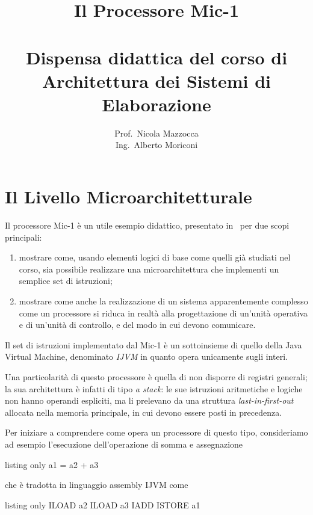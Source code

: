 \documentclass[a4paper,12pt]{scrreprt}
\title{Il Processore Mic-1 \\
  \ \\
  \large Dispensa didattica del corso di\\
  Architettura dei Sistemi di Elaborazione}
\author{Prof.\ Nicola Mazzocca \\
  Ing.\ Alberto Moriconi}
\date{}
\begin{document}
\maketitle

\chapter{Il Livello Microarchitetturale}

Il processore Mic-1 è un utile esempio didattico, presentato in~\cite{tanenbaum}
per due scopi principali:
\begin{enumerate}
  \item mostrare come, usando elementi logici di base come quelli già studiati
  nel corso, sia possibile realizzare una microarchitettura che implementi un
  semplice set di istruzioni;
  \item mostrare come anche la realizzazione di un sistema apparentemente
  complesso come un processore si riduca in realtà alla progettazione di
  un'unità operativa e di un'unità di controllo, e del modo in cui devono
  comunicare.
\end{enumerate}

Il set di istruzioni implementato dal Mic-1 è un sottoinsieme di quello della
Java Virtual Machine, denominato \textit{IJVM} in quanto opera unicamente sugli
interi.

Una particolarità di questo processore è quella di non disporre di registri
generali; la sua architettura è infatti di tipo \textit{a stack}: le sue
istruzioni aritmetiche e logiche non hanno operandi espliciti, ma li prelevano
da una struttura \textit{last-in-first-out} allocata nella memoria principale,
in cui devono essere posti in precedenza.

\medskip

Per iniziare a comprendere come opera un processore di questo tipo, consideriamo
ad esempio l'esecuzione dell'operazione di somma e assegnazione

\begin{tcblisting}{listing only}
  a1 = a2 + a3
\end{tcblisting}

che è tradotta in linguaggio assembly IJVM come

\begin{tcblisting}{listing only}
  ILOAD a2
  ILOAD a3
  IADD
  ISTORE a1
\end{tcblisting}
\end{document}
